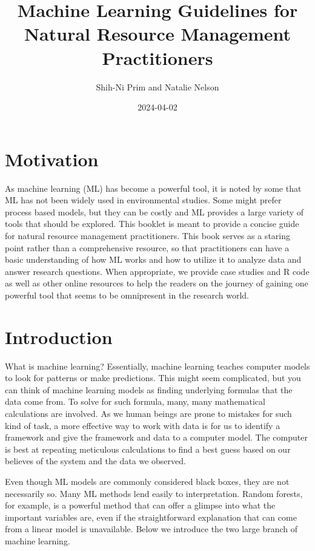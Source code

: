 \documentclass[
]{book}
\title{Machine Learning Guidelines for Natural Resource Management Practitioners}
\author{Shih-Ni Prim and Natalie Nelson}
\date{2024-04-02}
\begin{document}
\maketitle

{
\setcounter{tocdepth}{1}
\tableofcontents
}
\hypertarget{motivation}{%
\chapter{Motivation}\label{motivation}}

As machine learning (ML) has become a powerful tool, it is noted by some that ML has not been widely used in environmental studies. Some might prefer process based models, but they can be costly and ML provides a large variety of tools that should be explored. This booklet is meant to provide a concise guide for natural resource management practitioners. This book serves as a staring point rather than a comprehensive resource, so that practitioners can have a basic understanding of how ML works and how to utilize it to analyze data and answer research questions. When appropriate, we provide case studies and R code as well as other online resources to help the readers on the journey of gaining one powerful tool that seems to be omnipresent in the research world.

\hypertarget{intro}{%
\chapter{Introduction}\label{intro}}

What is machine learning? Essentially, machine learning teaches computer models to look for patterns or make predictions. This might seem complicated, but you can think of machine learning models as finding underlying formulas that the data come from. To solve for such formula, many, many mathematical calculations are involved. As we human beings are prone to mistakes for such kind of task, a more effective way to work with data is for us to identify a framework and give the framework and data to a computer model. The computer is best at repeating meticulous calculations to find a best guess based on our believes of the system and the data we observed.

Even though ML models are commonly considered black boxes, they are not necessarily so. Many ML methods lend easily to interpretation. Random forests, for example, is a powerful method that can offer a glimpse into what the important variables are, even if the straightforward explanation that can come from a linear model is unavailable. Below we introduce the two large branch of machine learning.
\end{document}
